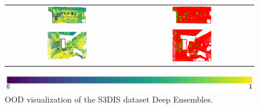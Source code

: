 \begin{figure}[h!]
\begin{tabular}{cc}
                \includegraphics[width=0.33\textwidth, height=0.18\textheight]{images/ood_imgs/de_s3dis/pnt_1_de_ent.png}& 
                \includegraphics[width=0.33\textwidth, height=0.18\textheight]{images/ood_imgs/de_s3dis/de_ent_3.png}\\
    
                \includegraphics[width=0.33\textwidth, height=0.18\textheight]{images/ood_imgs/de_s3dis/ofc_42_de_ent.png}& 
                \includegraphics[width=0.33\textwidth, height=0.18\textheight]{images/ood_imgs/de_s3dis/de_ent_1.png}\\
            \end{tabular}
            \includegraphics[scale=0.45]{images/prob_legend.pdf}
            \caption{OOD visualization of the S3DIS dataset Deep Ensembles.}
            \label{fig:de_s3dis_oodmap_ent}
        \end{figure}
